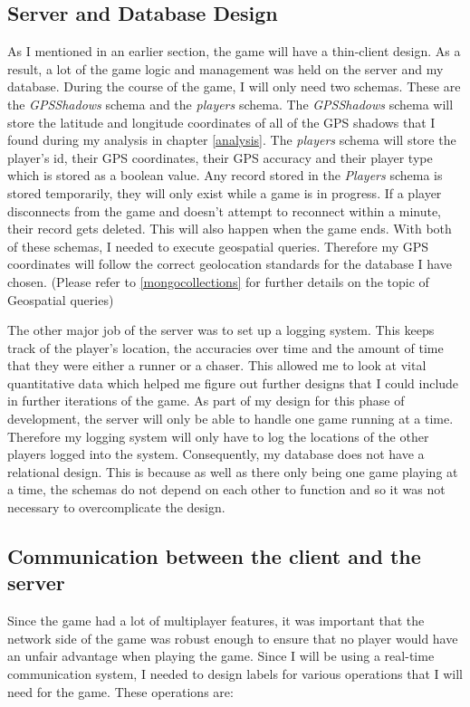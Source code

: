 \documentclass{l4proj}
\begin{document}
\subsection{Server and Database Design}
\label{databaseDesign}
As I mentioned in an earlier section, the game will have a thin-client design. As a result, a lot of the game logic and
management was held on the server and my database. During the course of the game, I will only need two schemas. These
are the \textit{GPSShadows} schema and the \textit{players} schema. The \textit{GPSShadows} schema will store the latitude
and longitude coordinates of all of the GPS shadows that I found during my analysis in chapter \ref{analysis}. The 
\textit{players} schema will store the player's id, their GPS coordinates, their GPS accuracy and their player type which is
stored as a boolean value. Any record stored in the \textit{Players} schema is stored temporarily, they will only exist while
a game is in progress. If a player disconnects from the game and doesn't attempt to reconnect within a minute, their record gets
deleted. This will also happen when the game ends. With both of these schemas, I needed to execute
geospatial queries. Therefore my GPS coordinates will follow the correct geolocation standards for the database I have chosen.
(Please refer to \ref{mongocollections} for further details on the topic of Geospatial queries)

The other major job of the server was to set up a logging system. This keeps track of the player's location, the accuracies
over time and the amount of time that they were either a runner or a chaser. This allowed me to look at vital quantitative data
which helped me figure out further designs that I could include in further iterations of the game. As part of my design for this
phase of development, the server will only be able to handle one game running at a time. Therefore my logging system will only
have to log the locations of the other players logged into the system. Consequently, my database does not have a relational
design. This is because as well as there only being one game playing at a time, the schemas do not depend on each other to
function and so it was not necessary to overcomplicate the design. 

\subsection{Communication between the client and the server}
\label{communication}
Since the game had a lot of multiplayer features, it was important that the network side of the game
was robust enough to ensure that no player would have an unfair advantage when playing the game. Since I will be using a
real-time communication system, I needed to design labels for various operations that I will need for the game. These operations are:
\end{document}
